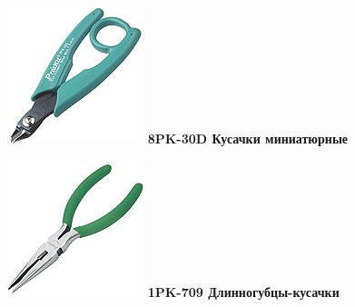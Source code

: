 {

\begin{multicols}{2}

\noindent\includegraphics[width=\columnwidth]{00/fig/pros/8PK-30D.jpg}
\textbf{8PK-30D Кусачки миниатюрные}

\noindent\includegraphics[width=\columnwidth]{00/fig/pros/1PK-709.jpg}
\textbf{1PK-709 Длинногубцы-кусачки}


\end{multicols}}
